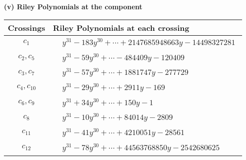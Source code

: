 \documentclass[1p]{elsarticle_modified}
\theoremstyle{definition}
\begin{document}
\newpage\renewcommand{\arraystretch}{1}
\flushleft \textbf{(v) Riley Polynomials at the component}\newline \\
\begin{tabular}{m{50pt}|m{274pt}}
Crossings & \hspace{64pt}Riley Polynomials at each crossing \\
\hline $$\begin{aligned}c_{1}\end{aligned}$$&$\begin{aligned}
&y^{31}-183 y^{30}+\cdots+2147685948663 y-14498327281
\end{aligned}$\\
\hline $$\begin{aligned}c_{2},c_{5}\end{aligned}$$&$\begin{aligned}
&y^{31}-59 y^{30}+\cdots-484409 y-120409
\end{aligned}$\\
\hline $$\begin{aligned}c_{3},c_{7}\end{aligned}$$&$\begin{aligned}
&y^{31}-57 y^{30}+\cdots+1881747 y-277729
\end{aligned}$\\
\hline $$\begin{aligned}c_{4},c_{10}\end{aligned}$$&$\begin{aligned}
&y^{31}-29 y^{30}+\cdots+2911 y-169
\end{aligned}$\\
\hline $$\begin{aligned}c_{6},c_{9}\end{aligned}$$&$\begin{aligned}
&y^{31}+34 y^{30}+\cdots+150 y-1
\end{aligned}$\\
\hline $$\begin{aligned}c_{8}\end{aligned}$$&$\begin{aligned}
&y^{31}-10 y^{30}+\cdots+84014 y-2809
\end{aligned}$\\
\hline $$\begin{aligned}c_{11}\end{aligned}$$&$\begin{aligned}
&y^{31}-41 y^{30}+\cdots+4210051 y-28561
\end{aligned}$\\
\hline $$\begin{aligned}c_{12}\end{aligned}$$&$\begin{aligned}
&y^{31}-78 y^{30}+\cdots+44563768850 y-2542680625
\end{aligned}$\\
\hline
\end{tabular}\\~\\
\end{document}
